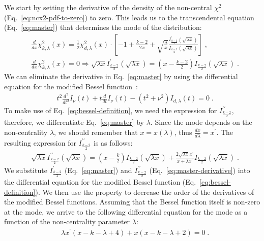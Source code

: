 \documentclass{amsart}
\numberwithin{equation}{section}
\begin{document}
We start by setting the derivative of the density of the non-central $\chi^2$ (Eq.~\ref{eq:ncx2-pdf-to-zero}) to zero. This leads us to the transcendental equation (Eq.~\ref{eq:master}) that determines the mode of the distribution:
%
\begin{align}
    &\frac{d}{dx} \chi^2_{k, \lambda}(x) = \frac{1}{2} \chi^2_{d, \lambda}(x) \cdot \left[ -1 + \frac{k-2}{2 x} + \sqrt{\frac{\lambda}{x}}\frac{I^{\prime}_{\frac{k-2}{2}}(\sqrt{\lambda x})}{I_{\frac{k-2}{2}}(\sqrt{\lambda x})} \right]\label{eq:ncx2-pdf-to-zero}\;, \\
    &\frac{d}{dx} \chi^2_{k, \lambda}(x) = 0 \Rightarrow \sqrt{\lambda x} I^{\prime}_{\frac{k-2}{2}}(\sqrt{\lambda x}) = (x - \frac{k-2}{2}) I_{\frac{k-2}{2}}(\sqrt{\lambda x})\label{eq:master}\;.
\end{align}
%
We can eliminate the derivative in Eq.~\ref{eq:master} by using the differential equation for the modified Bessel function~\cite[Eq.~10.25.1]{NIST:DLMF}:
%
\begin{align}
    &t^2 \frac{d^2}{dt^2} I_{\nu}(t) + t \frac{d}{dt} I_{\nu}(t) - (t^2 + \nu^2) I_{d, \lambda}(t) = 0 \label{eq:bessel-definition}\;.
\end{align}
%
To make use of Eq.~\ref{eq:bessel-definition}, we need the expression for $I^{\prime \prime}_{\frac{k-2}{2}}$, therefore, we differentiate Eq.~\ref{eq:master} by $\lambda$. Since the mode depends on the non-centrality $\lambda$, we should remember that $x = x(\lambda)$, thus $\frac{dx}{d\lambda} = x^{\prime}$. The resulting expression for $I^{\prime \prime}_{\frac{k-2}{2}}$ is as follows:
%
\begin{align}
    &\sqrt{\lambda x} I^{\prime \prime}_{\frac{k-2}{2}} (\sqrt{\lambda x}) =
    (x - \frac{k}{2}) I^{\prime}_{\frac{k-2}{2}}(\sqrt{\lambda x}) +  \frac{2 \sqrt{\lambda x} x^{\prime}}{x + \lambda x^\prime} I_{\frac{k-2}{2}}(\sqrt{\lambda x})\label{eq:master-derivative}\;.
\end{align}
%
We substitute $I^{\prime}_{\frac{k-2}{2}}$ (Eq.~\ref{eq:master}) and $I^{\prime \prime}_{\frac{k-2}{2}}$ (Eq.~\ref{eq:master-derivative}) into the differential equation for the modified Bessel function (Eq.~\ref{eq:bessel-definition}). We then use the property \cite[Eq.~10.29.4]{NIST:DLMF} to decrease the order of the derivatives of the modified Bessel functions. Assuming that the Bessel function itself is non-zero at the mode, we arrive to the following differential equation for the mode as a function of the non-centrality parameter $\lambda$:
%
\begin{align}
    &\lambda x^{\prime} (x - k - \lambda + 4) + x (x - k - \lambda + 2) = 0\;.\label{eq:master-ode}
\end{align}
%
\end{document}
